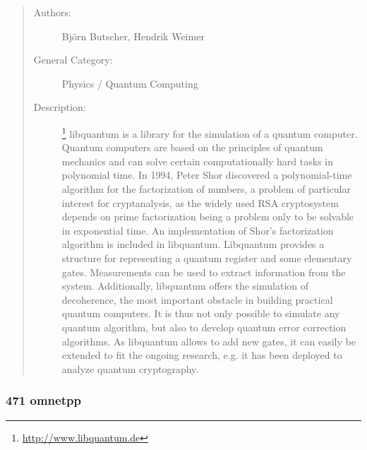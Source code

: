 \documentclass[onecolumn, openright, master, english, signatures]{dbrgrptt}
\begin{document}
\begin{quote}
\begin{description}
\item[Authors:] Bj\"orn Butscher, Hendrik Weimer

\item[General Category:] Physics / Quantum Computing

\item[Description:]\footnote{\url{http://www.libquantum.de}} libquantum is a library for the simulation of a quantum computer. Quantum computers are based on the principles of quantum mechanics and can solve certain computationally hard tasks in polynomial time.
In 1994, Peter Shor discovered a polynomial-time algorithm for the factorization of numbers, a problem of particular interest for cryptanalysis, as the widely used RSA cryptosystem depends on prime factorization being a problem only to be solvable in exponential time. An implementation of Shor's factorization algorithm is included in libquantum.
Libquantum provides a structure for representing a quantum register and some elementary gates. Measurements can be used to extract information from the system. Additionally, libquantum offers the simulation of decoherence, the most important obstacle in building practical quantum computers. It is thus not only possible to simulate any quantum algorithm, but also to develop quantum error correction algorithms. As libquantum allows to add new gates, it can easily be extended to fit the ongoing research, e.g. it has been deployed to analyze quantum cryptography.
\end{description}
\end{quote}

\subsubsection{471 omnetpp}
\end{document}
